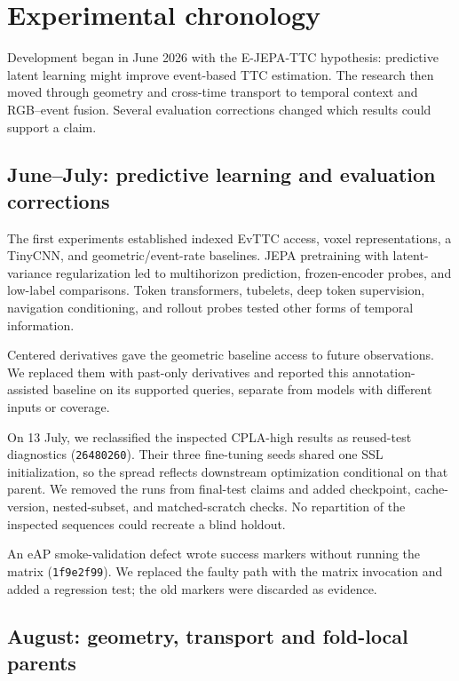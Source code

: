 \section{Experimental chronology}
\label{sec:history}

Development began in June 2026 with the E-JEPA-TTC hypothesis: predictive latent
learning might improve event-based TTC estimation. The research then moved
through geometry and cross-time transport to temporal context and RGB--event
fusion. Several evaluation corrections changed which results could support a
claim.

\subsection{June--July: predictive learning and evaluation corrections}

The first experiments established indexed EvTTC access, voxel representations,
a TinyCNN, and geometric/event-rate baselines. JEPA pretraining with
latent-variance regularization led to multihorizon prediction, frozen-encoder
probes, and low-label comparisons. Token transformers, tubelets, deep token
supervision, navigation conditioning, and rollout probes tested other forms of
temporal information.

Centered derivatives gave the geometric baseline access to future observations.
We replaced them with past-only derivatives and reported this annotation-assisted
baseline on its supported queries, separate from models with different inputs or
coverage.

On 13 July, we reclassified the inspected CPLA-high results as reused-test
diagnostics (\texttt{26480260}). Their three fine-tuning seeds shared one SSL
initialization, so the spread reflects downstream optimization conditional on
that parent. We removed the runs from final-test claims and added checkpoint,
cache-version, nested-subset, and matched-scratch checks. No repartition of the
inspected sequences could recreate a blind holdout.

An eAP smoke-validation defect wrote success markers without running the matrix
(\texttt{1f9e2f99}). We replaced the faulty path with the matrix invocation and
added a regression test; the old markers were discarded as evidence.

\subsection{August: geometry, transport and fold-local parents}


